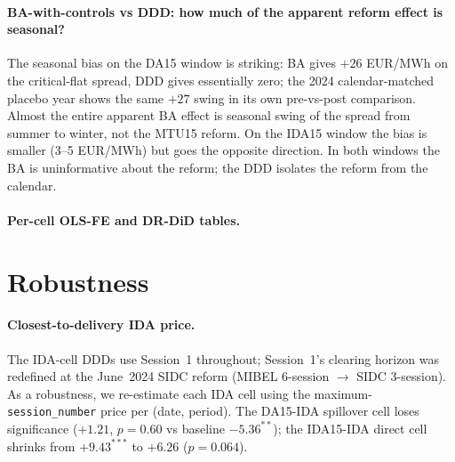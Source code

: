 \documentclass[11pt,a4paper]{article}
\newcommand{\code}[1]{\nolinkurl{#1}}
\begin{document}
\paragraph{BA-with-controls vs DDD: how much of the apparent reform effect is seasonal?}


The seasonal bias on the DA15 window is striking: BA gives $+26$ EUR/MWh on the critical-flat spread, DDD gives essentially zero; the 2024 calendar-matched placebo year shows the same $+27$ swing in its own pre-vs-post comparison. Almost the entire apparent BA effect is seasonal swing of the spread from summer to winter, not the MTU15 reform. On the IDA15 window the bias is smaller (3--5 EUR/MWh) but goes the opposite direction. In both windows the BA is uninformative about the reform; the DDD isolates the reform from the calendar.

\paragraph{Per-cell OLS-FE and DR-DiD tables.}









\section{Robustness}\label{sec:ident:price_robustness}

\paragraph{Closest-to-delivery IDA price.} The IDA-cell DDDs use Session~1 throughout; Session~1's clearing horizon was redefined at the June~2024 SIDC reform (MIBEL 6-session $\to$ SIDC 3-session). As a robustness, we re-estimate each IDA cell using the maximum-\code{session\_number} price per (date, period). The DA15-IDA spillover cell loses significance ($+1.21$, $p = 0.60$ vs baseline $-5.36^{**}$); the IDA15-IDA direct cell shrinks from $+9.43^{***}$ to $+6.26$ ($p = 0.064$).
\end{document}
